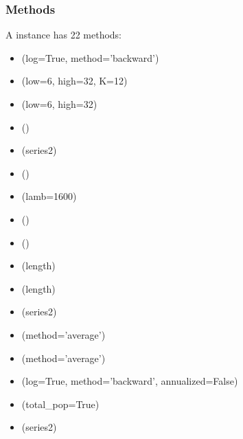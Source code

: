 \documentclass[letterpaper,10pt,openany,oneside,english]{sphinxmanual}
\begin{document}
\subsubsection{Methods}
\label{\detokenize{fredpy_examples:Methods}}
A {\hyperref[\detokenize{series_class:fredpy.series}]{}} instance has 22 methods:
\begin{itemize}
\item {} 
(log=True, method='backward')

\item {} 
(low=6, high=32, K=12)

\item {} 
(low=6, high=32)

\item {} 
()

\item {} 
(series2)

\item {} 
()

\item {} 
(lamb=1600)

\item {} 
()

\item {} 
()

\item {} 
(length)

\item {} 
(length)

\item {} 
(series2)

\item {} 
(method='average')

\item {} 
(method='average')

\item {} 
(log=True, method='backward', annualized=False)

\item {} 
(total\_pop=True)

\item {} 
(series2)


\end{itemize}
\end{document}
